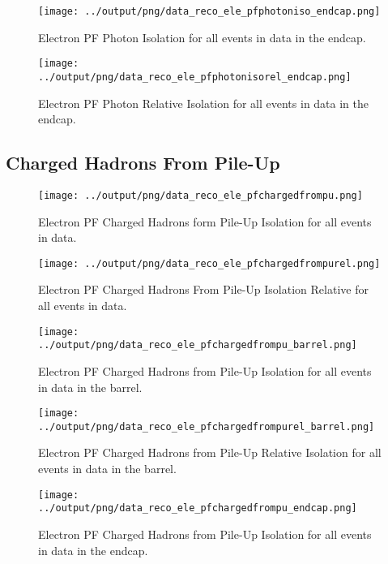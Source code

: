 \documentclass[11pt]{book}
\begin{document}
\begin{figure}[htb]
\centering
\texttt{[image: ../output/png/data\_reco\_ele\_pfphotoniso\_endcap.png]}
\caption{Electron PF Photon Isolation for all events in data in the endcap.}
\label{fig:data_ele_pfphotoniso_endcap}
\end{figure}

\begin{figure}[htb]
\centering
\texttt{[image: ../output/png/data\_reco\_ele\_pfphotonisorel\_endcap.png]}
\caption{Electron PF Photon Relative Isolation for all events in data in the endcap.}
\label{fig:data_ele_pfphotonisorel_endcap}
\end{figure}
\clearpage

\subsection{Charged Hadrons From Pile-Up}
\begin{figure}[htb]
\centering
\texttt{[image: ../output/png/data\_reco\_ele\_pfchargedfrompu.png]}
\caption{Electron PF Charged Hadrons form Pile-Up Isolation for all events in data.}
\label{fig:data_ele_pfchargedfrompu}
\end{figure}

\begin{figure}[htb]
\centering
\texttt{[image: ../output/png/data\_reco\_ele\_pfchargedfrompurel.png]}
\caption{Electron PF Charged Hadrons From Pile-Up Isolation Relative for all events in data.}
\label{fig:data_ele_pfchargedfrompurel}
\end{figure}

\begin{figure}[htb]
\centering
\texttt{[image: ../output/png/data\_reco\_ele\_pfchargedfrompu\_barrel.png]}
\caption{Electron PF Charged Hadrons from Pile-Up Isolation for all events in data in the barrel.}
\label{fig:data_ele_pfchargedfrompu_barrel}
\end{figure}

\begin{figure}[htb]
\centering
\texttt{[image: ../output/png/data\_reco\_ele\_pfchargedfrompurel\_barrel.png]}
\caption{Electron PF Charged Hadrons from Pile-Up Relative Isolation for all events in data in the barrel.}
\label{fig:data_ele_pfchargedfrompurel_barrel}
\end{figure}

\begin{figure}[htb]
\centering
\texttt{[image: ../output/png/data\_reco\_ele\_pfchargedfrompu\_endcap.png]}
\caption{Electron PF Charged Hadrons from Pile-Up Isolation for all events in data in the endcap.}
\label{fig:data_ele_pfchargedfrompu_endcap}
\end{figure}
\end{document}
